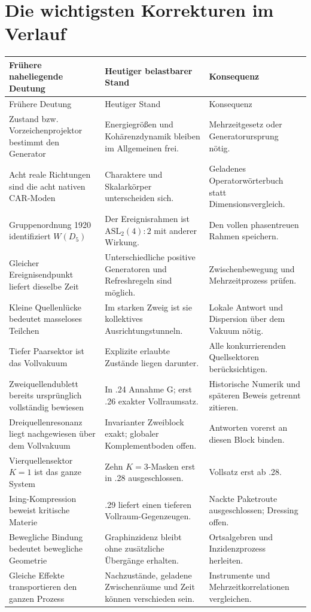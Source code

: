 \section{Die wichtigsten Korrekturen im Verlauf}
\begin{longtable}{@{}P{.25\textwidth}P{.42\textwidth}P{.25\textwidth}@{}}
\toprule
Frühere naheliegende Deutung & Heutiger belastbarer Stand & Konsequenz\\\midrule
\endfirsthead
\toprule Frühere Deutung & Heutiger Stand & Konsequenz\\\midrule
\endhead
Zustand bzw. Vorzeichenprojektor bestimmt den Generator & Energiegrößen und Kohärenzdynamik bleiben im Allgemeinen frei. & Mehrzeitgesetz oder Generatorursprung nötig.\\[4pt]
Acht reale Richtungen sind die acht nativen CAR-Moden & Charaktere und Skalarkörper unterscheiden sich. & Geladenes Operatorwörterbuch statt Dimensionsvergleich.\\[4pt]
Gruppenordnung 1920 identifiziert $W(D_5)$ & Der Ereignisrahmen ist $\mathrm{ASL}_2(4):2$ mit anderer Wirkung. & Den vollen phasentreuen Rahmen speichern.\\[4pt]
Gleicher Ereignisendpunkt liefert dieselbe Zeit & Unterschiedliche positive Generatoren und Refreshregeln sind möglich. & Zwischenbewegung und Mehrzeitprozess prüfen.\\[4pt]
Kleine Quellenlücke bedeutet masseloses Teilchen & Im starken Zweig ist sie kollektives Ausrichtungstunneln. & Lokale Antwort und Dispersion über dem Vakuum nötig.\\[4pt]
Tiefer Paarsektor ist das Vollvakuum & Explizite erlaubte Zustände liegen darunter. & Alle konkurrierenden Quellsektoren berücksichtigen.\\[4pt]
Zweiquellendublett bereits ursprünglich vollständig bewiesen & In .24 Annahme G; erst .26 exakter Vollraumsatz. & Historische Numerik und späteren Beweis getrennt zitieren.\\[4pt]
Dreiquellenresonanz liegt nachgewiesen über dem Vollvakuum & Invarianter Zweiblock exakt; globaler Komplementboden offen. & Antworten vorerst an diesen Block binden.\\[4pt]
Vierquellensektor $K=1$ ist das ganze System & Zehn $K=3$-Masken erst in .28 ausgeschlossen. & Vollsatz erst ab .28.\\[4pt]
Ising-Kompression beweist kritische Materie & .29 liefert einen tieferen Vollraum-Gegenzeugen. & Nackte Paketroute ausgeschlossen; Dressing offen.\\[4pt]
Bewegliche Bindung bedeutet bewegliche Geometrie & Graphinzidenz bleibt ohne zusätzliche Übergänge erhalten. & Ortsalgebren und Inzidenzprozess herleiten.\\[4pt]
Gleiche Effekte transportieren den ganzen Prozess & Nachzustände, geladene Zwischenräume und Zeit können verschieden sein. & Instrumente und Mehrzeitkorrelationen vergleichen.\\\bottomrule
\end{longtable}

